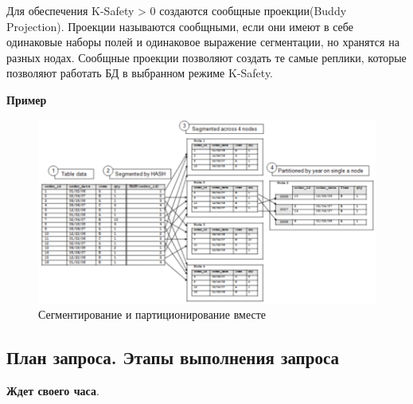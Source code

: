 Для обеспечения K-Safety > 0 создаются сообщные проекции(Buddy Projection). Проекции называются сообщными, если они имеют в себе одинаковые наборы полей и одинаковое выражение сегментации, но хранятся на разных нодах. Сообщные проекции позволяют создать те самые реплики, которые позволяют работать БД в выбранном режиме K-Safety. 

\textbf{Пример}

\begin{figure}[h]
	\centering
	\includegraphics[width=18cm, keepaspectratio]{assets/segm.png}
	\caption{Сегментирование и партиционирование вместе} 
\end{figure}



\subsection{План запроса. Этапы выполнения запроса}

\textbf{Ждет своего часа}.
